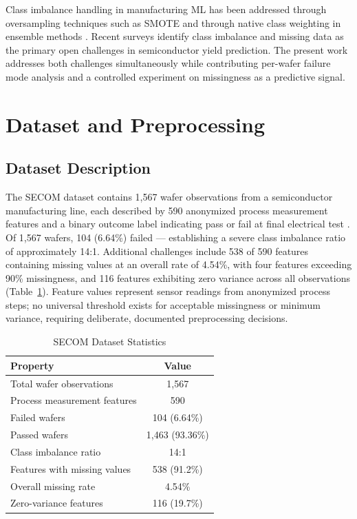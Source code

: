 \documentclass[conference]{IEEEtran}
\begin{document}
Class imbalance handling in manufacturing ML has been addressed 
through oversampling techniques such as SMOTE \cite{chawla2002smote} 
and through native class weighting in ensemble methods 
\cite{boyapati2024enhancing}. Recent surveys 
\cite{huang2023survey,zhao2026survey} identify class imbalance and 
missing data as the primary open challenges in semiconductor yield 
prediction. The present work addresses both challenges 
simultaneously while contributing per-wafer failure mode 
analysis and a controlled experiment on missingness as a 
predictive signal.

\section{Dataset and Preprocessing}
\subsection{Dataset Description}

The SECOM dataset contains 1,567 wafer observations from a 
semiconductor manufacturing line, each described by 590 anonymized 
process measurement features and a binary outcome label indicating 
pass or fail at final electrical test \cite{dua2019uci}. Of 1,567 
wafers, 104 (6.64\%) failed --- establishing a severe class 
imbalance ratio of approximately 14:1. Additional challenges 
include 538 of 590 features containing missing values at an overall 
rate of 4.54\%, with four features exceeding 90\% missingness, and 
116 features exhibiting zero variance across all observations 
(Table~\ref{tab:dataset}). Feature values represent sensor readings 
from anonymized process steps; no universal threshold exists for 
acceptable missingness or minimum variance, requiring deliberate, 
documented preprocessing decisions.

\begin{table}[!htb]
\caption{SECOM Dataset Statistics}
\label{tab:dataset}
\centering
\footnotesize
\begin{tabular}{lc}
\hline
\textbf{Property} & \textbf{Value} \\
\hline
Total wafer observations & 1,567 \\
Process measurement features & 590 \\
Failed wafers & 104 (6.64\%) \\
Passed wafers & 1,463 (93.36\%) \\
Class imbalance ratio & 14:1 \\
Features with missing values & 538 (91.2\%) \\
Overall missing rate & 4.54\% \\
Zero-variance features & 116 (19.7\%) \\
\hline
\end{tabular}
\end{table}
\end{document}
